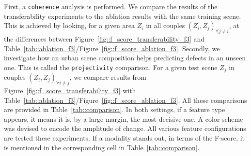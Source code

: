         First, a \texttt{coherence} analysis is performed.
        We compare the results of the transferability experiments to the ablation results with the same training scene.
        This is achieved by looking, for a given area $Z_i$ in all couples $(Z_i, Z_j)_{\forall j \neq i}$, at the differences between Figure~\ref{fig::f_score_transferability_f3} and Table~\ref{tab::ablation_f3}/Figure~\ref{fig::f_score_ablation_f3}.
        Secondly, we investigate how an urban scene composition helps predicting defects in an unseen one.
        This is called the \texttt{projectivity} comparison.
        For a given test scene $Z_j$ in couples $(Z_i, Z_j)_{\forall i \neq j}$, we compare results from Figure~\ref{fig::f_score_transferability_f3} with Table~\ref{tab::ablation_f3}/Figure~\ref{fig::f_score_ablation_f3}.
        All these comparisons are provided in Table~\ref{tab::comparison}.
        In both settings, if a feature type appears, it means it is, by a large margin, the most decisive one.
        A color scheme was devised to encode the amplitude of change.
        All various feature configurations are tested these experiments.
        If a modality stands out, in terms of the F-score, it is mentioned in the corresponding cell in Table~\ref{tab::comparison}.\\

